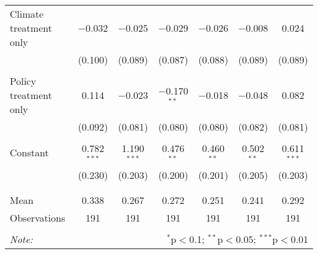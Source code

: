 \begin{tabular}{@{\extracolsep{5pt}}lcccccc}
 Climate treatment only & $-$0.032 & $-$0.025 & $-$0.029 & $-$0.026 & $-$0.008 & 0.024 \\ 
  & (0.100) & (0.089) & (0.087) & (0.088) & (0.089) & (0.089) \\ 
  & & & & & & \\ 
 Policy treatment only & 0.114 & $-$0.023 & $-$0.170$^{**}$ & $-$0.018 & $-$0.048 & 0.082 \\ 
  & (0.092) & (0.081) & (0.080) & (0.080) & (0.082) & (0.081) \\ 
  & & & & & & \\ 
 Constant & 0.782$^{***}$ & 1.190$^{***}$ & 0.476$^{**}$ & 0.460$^{**}$ & 0.502$^{**}$ & 0.611$^{***}$ \\ 
  & (0.230) & (0.203) & (0.200) & (0.201) & (0.205) & (0.203) \\ 
  & & & & & & \\ 
\hline \\[-1.8ex] 
Mean & 0.338 & 0.267 & 0.272 & 0.251 & 0.241 & 0.292 \\ 
Observations & 191 & 191 & 191 & 191 & 191 & 191 \\ 
\hline 
\hline \\[-1.8ex] 
\textit{Note:}  & \multicolumn{6}{r}{$^{*}$p$<$0.1; $^{**}$p$<$0.05; $^{***}$p$<$0.01} \\ 
\end{tabular} 
